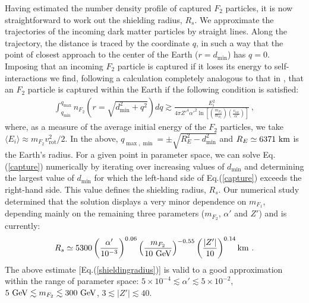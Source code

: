 \documentclass[12pt]{article}
\begin{document}
Having estimated the number density profile of captured $F_2$ particles, it is now straightforward to work out the shielding radius, $R_s$. We approximate the trajectories of the incoming dark matter particles by straight lines. Along the trajectory, the distance is traced by the coordinate $q$, in such a way that the point of closest approach to the center of the Earth ($r = d _{\min}$) has $q=0$. Imposing that an incoming $F_2$ particle is captured if it loses its energy to self-interactions we find, following a calculation completely analogous to that in \cite{footdiurnal}, that an $F_2$ particle is captured within the Earth if the following condition is satisfied:
%
\begin{eqnarray}
\int _{q _{\min}} ^{q _{\max}} n _{F_2}\left ( r = \sqrt{d _{\min} ^2 + q ^2} \right ) dq \gtrsim \frac{E _i ^2}{4\pi{Z'} ^4{\alpha '} ^2\ln \left [ \left (\frac{m _{F_2}}{m _{F_1}} \right ) \left ( \frac{v _{\text{rot}}}{\alpha '} \right ) \right ]} \ ,
\label{capture}
\end{eqnarray}
%
where, as a measure of the average initial energy of the $F_2$ particles, we take $\langle E _i \rangle \approx m _{F_2}v _{\text{rot}} ^2/2$. In the above, $q _{\max,\min} = \pm \sqrt{R _E ^2 - d _{\min} ^2}$ and $R _E \simeq 6371 \ \rm km$ is the Earth's radius. For a given point in parameter space, we can solve Eq.(\ref{capture}) numerically by iterating over increasing values of $d _{\min}$ and determining the largest value of $d _{\min}$ for which the left-hand side of Eq.(\ref{capture}) exceeds the right-hand side. This value defines the shielding radius, $R _s$. Our numerical study determined that the solution displays a very minor dependence on $m _{F_1}$, depending mainly on the remaining three parameters ($m _{F_2}$, $\alpha '$ and $Z'$) and is currently:
%
\begin{eqnarray}
R _s \simeq 5300 \left ( \frac{\alpha '}{10 ^{-3}} \right ) ^{0.06}\left ( \frac{m _{F_2}}{10 \ \rm GeV} \right ) ^{-0.55}\left ( \frac{|Z'|}{10} \right ) ^{0.14} {\rm km} \ .
\label{shieldingradius}
\end{eqnarray}
%
The above estimate [Eq.(\ref{shieldingradius})] is valid to a good approximation within the range of parameter space: $5 \times 10 ^{-4} \lesssim \alpha ' \lesssim 5 \times 10 ^{-2}$, $5 \ {\rm GeV} \lesssim m _{F_2} \lesssim 300 \ {\rm GeV}$, $3 \lesssim |Z'| \lesssim 40$.
\end{document}

